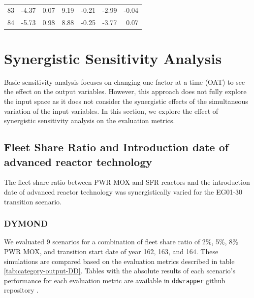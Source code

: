 \begin{table}[H]
\begin{tabularx}{\textwidth}{R|RRRRRR}
            83  & -4.37            & 0.07                           & 9.19          & -0.21                       & -2.99             & -0.04                           \\
            84 & -5.73            & 0.98                           & 8.88          & -0.25                       & -3.77             & 0.07                           \\ \hline
           \end{tabularx}%
        \end{table}

\section{Synergistic Sensitivity Analysis}
\label{sec:synergistic}
Basic sensitivity analysis focuses on changing one-factor-at-a-time 
(OAT) to see the effect on the output variables. 
However, this approach does not fully explore the input space as
it does not consider the synergistic effects of the simultaneous 
variation of the input variables.
In this section, we explore the effect of synergistic sensitivity 
analysis on the evaluation metrics.

\subsection{Fleet Share Ratio and Introduction date of advanced 
reactor technology}
The fleet share ratio between PWR MOX and SFR 
reactors and the introduction date of advanced reactor 
technology was synergistically varied for 
the EG01-30 transition scenario. 

\subsubsection{\textbf{DYMOND}}
We evaluated 9 scenarios for a combination of fleet share ratio of 
2\%, 5\%, 8\% PWR MOX, and transition start date of year 162, 163, and 164.
These simulations are compared based on the evaluation
metrics described in table \ref{tab:category-output-DD}.
Tables with the absolute results of each scenario's performance 
for each evaluation metric are available in  \texttt{ddwrapper} github repository 
\cite{chee_gwenchee/ddwrapper_2019}. 

